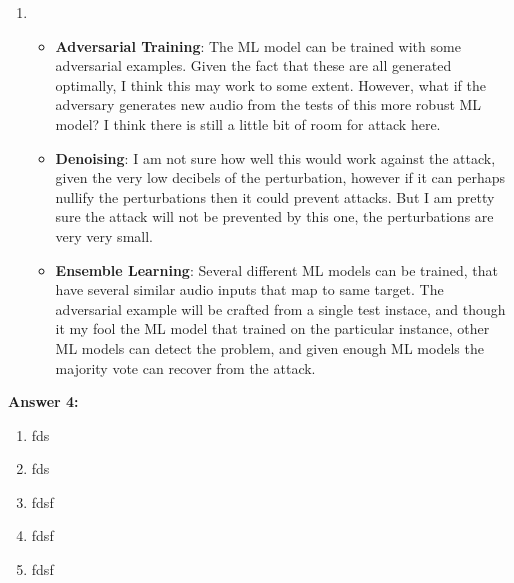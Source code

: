 \documentclass[12pt,reqno]{amsart}
\begin{document}
\begin{enumerate}[label=(\alph*)]
\item \begin{itemize}
	\item \textbf{Adversarial Training}: The ML model can be trained with some adversarial examples. Given the fact that these are all generated optimally, I think this may work to some extent. However, what if the adversary generates new audio from the tests of this more robust ML model? I think there is still a little bit of room for attack here.
	\item \textbf{Denoising}: I am not sure how well this would work against the attack, given the very low decibels of the perturbation, however if it can perhaps nullify the perturbations then it could prevent attacks. But I am pretty sure the attack will not be prevented by this one, the perturbations are very very small.
	\item \textbf{Ensemble Learning}: Several different ML models can be trained, that have several similar audio inputs that map to same target. The adversarial example will be crafted from a single test instace, and though it my fool the ML model that trained on the particular instance, other ML models can detect the problem, and given enough ML models the majority vote can recover from the attack.
			
\end{itemize}

\end{enumerate}

\newpage
\textbf{Answer 4:} 
\begin{enumerate}[label=(\alph*)]
\item fds

\item fds

\item  fdsf

\item fdsf

\item fdsf

\end{enumerate}
\end{document}
